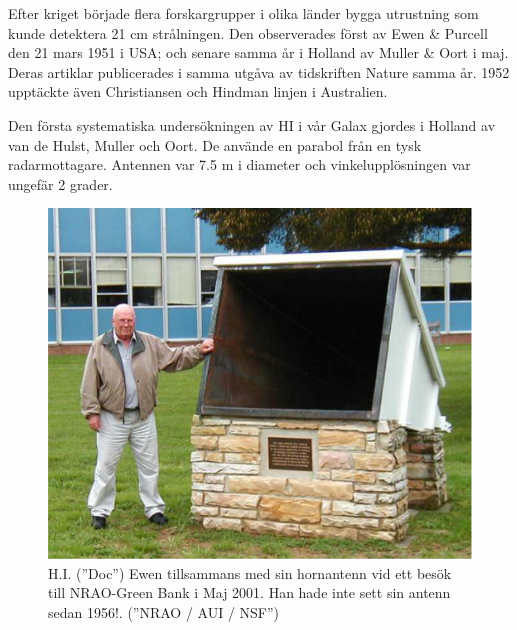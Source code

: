 Efter kriget började flera forskargrupper i olika länder bygga
utrustning som kunde detektera 21 cm strålningen. Den observerades
först av Ewen \& Purcell den 21 mars 1951 i USA; och senare samma år i
Holland av Muller \& Oort i maj. Deras artiklar publicerades i samma
utgåva av tidskriften Nature samma år. 1952 upptäckte även
Christiansen och Hindman linjen i Australien.

Den första systematiska undersökningen av HI i vår Galax gjordes i
Holland av van de Hulst, Muller och Oort. De använde en parabol från
en tysk radarmottagare. Antennen var 7.5 m i diameter och
vinkelupplösningen var ungefär 2 grader.

\begin{figure}[h]
  \centering
  \includegraphics[width = 8 cm]{../figures/ev2.pdf}
  \caption{ H.I. (''Doc'') Ewen tillsammans med sin hornantenn vid ett
    besök till NRAO-Green Bank i Maj 2001. Han hade inte sett sin
    antenn sedan 1956!. (''NRAO / AUI / NSF'') }
  \label{fig:evpu}
\end{figure}

